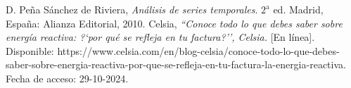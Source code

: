 \begin{thebibliography}{99}
	 D. Pe\~na S\'anchez de Riviera, 
	{\it An\'alisis de series temporales}. $2^{\text{a}}$ ed. Madrid, Espa\~na:  Alianza Editorial, 2010.
	 Celsia, 
	{\it ``Conoce todo lo que debes saber sobre energ\'ia reactiva: ?`por qu\'e se refleja en tu factura?'', Celsia.} [En l\'inea]. Disponible: https://www.celsia.com/en/blog-celsia/conoce-todo-lo-que-debes-saber-sobre-energia-reactiva-por-que-se-refleja-en-tu-factura-la-energia-reactiva. Fecha de acceso: 29-10-2024.
\end{thebibliography}